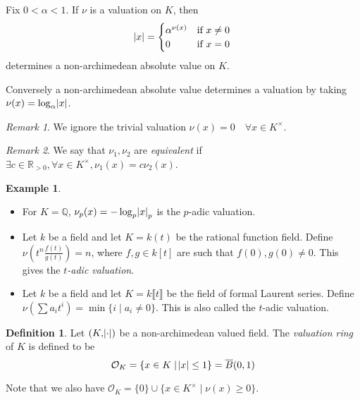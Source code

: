\documentclass[12pt]{amsart}
\theoremstyle{definition}
\newtheorem{definition}{Definition}[section]
\newtheorem*{example}{Example}
\theoremstyle{plain}
\theoremstyle{remark}
\newtheorem*{remark}{Remark}
\newcommand{\bQ}{\mathbb{Q}}
\newcommand{\bR}{\mathbb{R}}
\newcommand{\cO}{\mathcal{O}}
\begin{document}
\noindent Fix $0 < \alpha < 1$. If $\nu$ is a valuation on $K$, then
\begin{equation*}
    \abs{x} =
    \begin{cases}
        \alpha^{\nu(x)} & \text{if } x \neq 0\\
        0 & \text{if } x = 0
    \end{cases}
\end{equation*}
determines a non-archimedean absolute value on $K$.

Conversely a non-archimedean absolute value determines a valuation by taking $\nu(x) = \log_\alpha \abs{x}$.

\begin{remark}
    We ignore the trivial valuation $\nu(x) = 0 \quad \forall x \in K^\times$.
\end{remark}
\begin{remark}
    We say that $\nu_1, \nu_2$ are \emph{equivalent} if $\exists c \in \bR_{> 0}, \forall x \in K^\times, \nu_1(x) = c \nu_2(x)$.
\end{remark}

\begin{example}\phantom{}
    \begin{itemize}
        \item For $K = \bQ$, $\nu_p(x) = -\log_p \abs{x}_p$ is the $p$-adic valuation.
        \item Let $k$ be a field and let $K = k(t)$ be the rational function field. Define $\nu(t^n \frac{f(t)}{g(t)}) = n$, where $f, g \in k[t]$ are such that $f(0), g(0) \neq 0$. This gives the \emph{$t$-adic valuation}.
        \item Let $k$ be a field and let $K = k \llbracket t \rrbracket$ be the field of formal Laurent series. Define $\nu(\sum a_i t^i) = \min \{i \mid a_i \neq 0\}$. This is also called the $t$-adic valuation.
    \end{itemize}
\end{example}

\begin{definition}
    Let $(K, \abs{\cdot})$ be a non-archimedean valued field. The \emph{valuation ring} of $K$ is defined to be
    \begin{equation*}
        \cO_K = \{x \in K \mid \abs{x} \le 1\} = \overline{B}(0, 1)
    \end{equation*}
\end{definition}
\noindent Note that we also have $\cO_K = \{0\} \cup \{x \in K^\times \mid \nu(x) \ge 0\}$.
\end{document}
